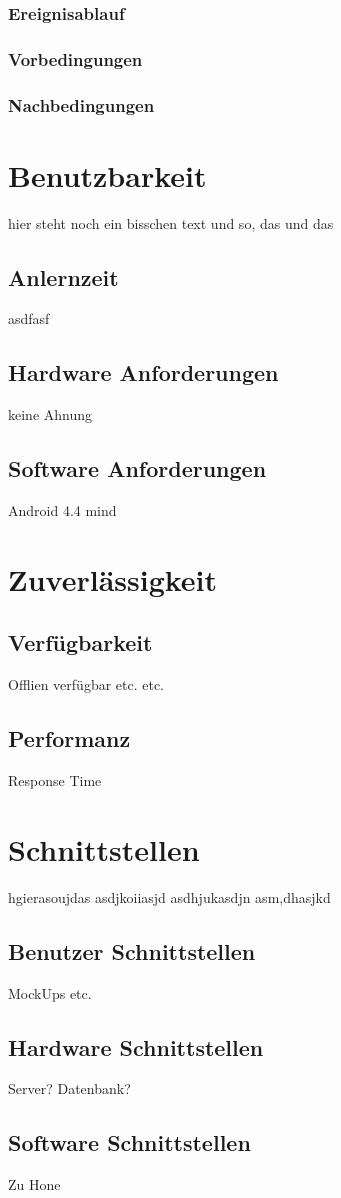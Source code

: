 		\subsubsection{Ereignisablauf}
			
		\subsubsection{Vorbedingungen}
			
		\subsubsection{Nachbedingungen}	
	
\section{Benutzbarkeit}
hier steht noch ein bisschen text und so, das und das
	
	\subsection{Anlernzeit}
		asdfasf
	
	\subsection{Hardware Anforderungen}
		keine Ahnung
	
	\subsection{Software Anforderungen}
		Android 4.4 mind
		
\section{Zuverlässigkeit}
	
	\subsection{Verfügbarkeit}
		Offlien verfügbar etc. etc.
		
	\subsection{Performanz}
		Response Time 
	
\section{Schnittstellen}
hgierasoujdas asdjkoiiasjd asdhjukasdjn asm,dhasjkd

	\subsection{Benutzer Schnittstellen}
		MockUps etc.
		
	\subsection{Hardware Schnittstellen}
		Server? Datenbank?		
		
	\subsection{Software Schnittstellen}
		Zu Hone

